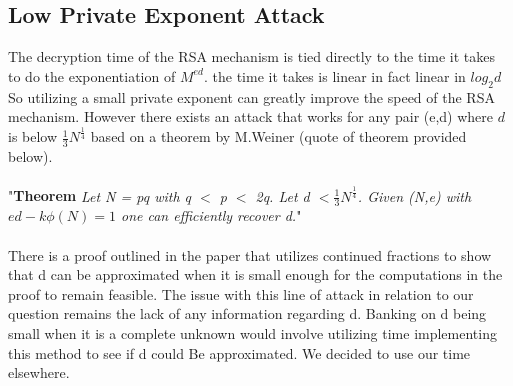 \documentclass[12pt]{article} %
\begin{document}
\subsection{Low Private Exponent Attack}
The decryption time of the RSA mechanism is tied directly to the time it takes to do the exponentiation of $ M^{ed} $. the time it takes is linear in fact linear in $log_{2}d $ So utilizing a small private exponent can greatly improve the speed of the RSA mechanism. However there exists an attack that
works for any pair (e,d) where $d$ is below $ \frac{1}{3}N^{\frac{1}{4}} $ based on a theorem by M.Weiner (quote of theorem provided below).
\\\\
"\textbf{Theorem} \textit{Let N = pq with q $<$ p $ <$ 2q. Let d $<  \frac{1}{3}N^{\frac{1}{4}} $. Given (N,e) with $ed - k\phi(N) = 1$ one can efficiently recover d.}"
\\\\
\indent There is a proof outlined in the paper that utilizes continued fractions to show that d can be approximated when it is small enough for the computations in the proof to remain feasible. The issue with this line of attack in relation to our question remains the lack of any information regarding d. Banking on d being small when it is a complete unknown would involve utilizing time implementing this method to see if d could Be approximated. We decided to use our time elsewhere.
\end{document}
